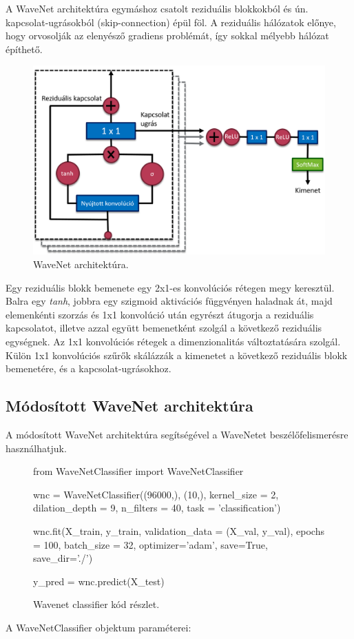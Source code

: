 A WaveNet architektúra egymáshoz csatolt reziduális blokkokból és ún. kapcsolat-ugrásokból (skip-connection) épül föl. A reziduális hálózatok előnye, hogy orvosolják az elenyésző gradiens problémát, így sokkal mélyebb hálózat építhető.

\begin{figure}[!ht]
	\centering
	\includegraphics[width=150mm, keepaspectratio]{figures/wavenet_arch.png}
	\caption{WaveNet architektúra.}
	\label{fig:wavenet_arch}
\end{figure}

Egy reziduális blokk bemenete egy 2x1-es konvolúciós rétegen megy keresztül. Balra egy \emph{tanh}, jobbra egy szigmoid aktivációs függvényen haladnak át, majd elemenkénti szorzás és 1x1 konvolúció után egyrészt átugorja a reziduális kapcsolatot, illetve azzal együtt bemenetként szolgál a következő reziduális egységnek. Az 1x1 konvolúciós rétegek a dimenzionalitás változtatására szolgál. Külön 1x1 konvolúciós szűrők skálázzák a kimenetet a következő reziduális blokk bemenetére, és a kapcsolat-ugrásokhoz.

\subsection{Módosított WaveNet architektúra}

A módosított WaveNet architektúra segítségével a WaveNetet beszélőfelismerésre használhatjuk.
\bigskip
\begin{figure}[H]
	\centering
	\begin{python}
		from WaveNetClassifier import WaveNetClassifier
		
		wnc = WaveNetClassifier((96000,), (10,), kernel_size = 2, dilation_depth = 9,
		                         n_filters = 40, task = 'classification')
		
		wnc.fit(X_train, y_train, validation_data = (X_val, y_val), epochs = 100,
		        batch_size = 32, optimizer='adam', save=True, save_dir='./')
		
		y_pred = wnc.predict(X_test)
	\end{python}
	\caption{Wavenet classifier kód részlet.}
	\label{code:wavenet-classifier}
\end{figure}
\bigskip
A WaveNetClassifier objektum paraméterei:

